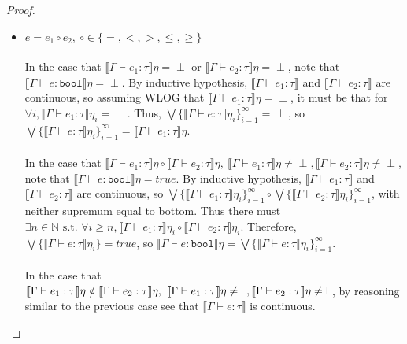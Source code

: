 \documentclass{westhesis}
\theoremstyle{plain}
\theoremstyle{definition}
\begin{document}
\begin{proof}
\begin{itemize}
  \item $e = e_1 \circ e_2, \ \circ \in \{=,<,>,\leq,\geq\}$\\ \\
  In the case that $\llbracket \Gamma \vdash e_1 : \tau \rrbracket\eta = \perp$ or $\llbracket \Gamma \vdash e_2 : \tau 
  \rrbracket\eta = \perp$, note that $\llbracket \Gamma \vdash e : \texttt{bool}\rrbracket\eta = \perp$. By inductive hypothesis, 
  $\llbracket \Gamma \vdash e_1 : \tau \rrbracket$ and $\llbracket \Gamma \vdash e_2 : \tau \rrbracket$ are continuous, so 
  assuming WLOG that $\llbracket \Gamma \vdash e_1 : \tau \rrbracket\eta = \perp$, it must be that for $\forall i, \llbracket 
  \Gamma \vdash e_1 : \tau \rrbracket\eta_i = \perp$. Thus, $\bigvee\{\llbracket \Gamma \vdash e : \tau \rrbracket\eta_i\}
  ^{\infty}_{i=1} = \perp$, so $\bigvee\{\llbracket \Gamma \vdash e : \tau \rrbracket\eta_i\}
  ^{\infty}_{i=1} = \llbracket \Gamma \vdash e_1 : \tau \rrbracket\eta$.\\ \\
  In the case that $\llbracket \Gamma \vdash e_1 : \tau \rrbracket\eta \circ \llbracket \Gamma \vdash e_2 : \tau \rrbracket\eta, \ 
  \llbracket \Gamma \vdash e_1:\tau \rrbracket\eta \neq \perp, \llbracket \Gamma \vdash e_2 : \tau \rrbracket\eta \neq \perp$, 
  note that $\llbracket \Gamma \vdash e : \texttt{bool}\rrbracket\eta = true$. By inductive hypothesis, $\llbracket 
  \Gamma \vdash e_1 : \tau \rrbracket$ and $\llbracket \Gamma \vdash e_2 : \tau \rrbracket$ are continuous, so $\bigvee\{\llbracket \Gamma \vdash e_1 : \tau \rrbracket\eta_i\}^{\infty}_{i=1} \circ \bigvee\{\llbracket \Gamma \vdash e_2 : \tau \rrbracket\eta_i\}^{\infty}_{i=1}$, with neither supremum equal to bottom. Thus there must $\exists n \in \mathbb{N} \text{ s.t. } \forall i \geq n, \llbracket \Gamma \vdash e_1 : \tau \rrbracket\eta_i \circ
  \llbracket \Gamma \vdash e_2 : \tau \rrbracket\eta_i$. Therefore, $\bigvee\{\llbracket \Gamma \vdash e : \tau \rrbracket\eta_i\} = true$, so $\llbracket \Gamma \vdash e : \texttt{bool}\rrbracket\eta = \bigvee\{\llbracket \Gamma \vdash e : \tau \rrbracket\eta_i\}^{\infty}_{i=1}$. \\ \\
 In the case that $\llbracket \Gamma \vdash e_1 : \tau \rrbracket\eta \ \slashed{\circ} \ \llbracket \Gamma \vdash e_2 : \tau\rrbracket\eta, \ \llbracket \Gamma \vdash e_1 : \tau \rrbracket\eta \neq \perp, \\ \llbracket \Gamma \vdash e_2 : \tau \rrbracket\eta \neq \perp$, by reasoning similar to the previous case see that $\llbracket \Gamma \vdash e : \tau \rrbracket$ is continuous.

\end{itemize}
\end{proof}
\end{document}
